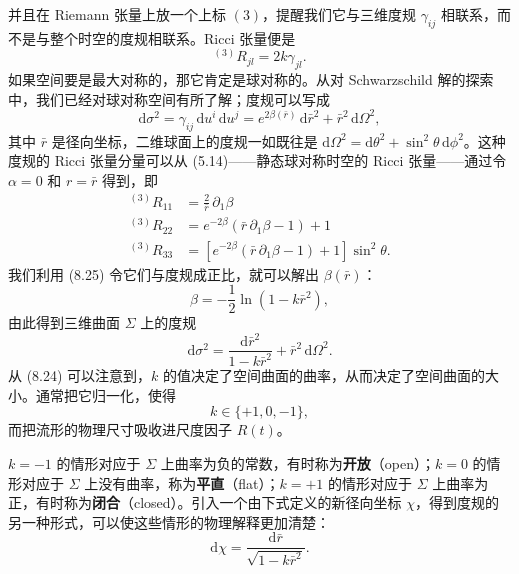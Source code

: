 并且在 Riemann 张量上放一个上标 $(3)$，提醒我们它与三维度规 $\gamma_{ij}$ 相联系，而不是与整个时空的度规相联系。Ricci 张量便是
\begin{equation*}
{}^{(3)}R_{jl} = 2k\gamma_{jl}.
\tag{8.25}
\end{equation*}
如果空间要是最大对称的，那它肯定是球对称的。从对 Schwarzschild 解的探索中，我们已经对球对称空间有所了解；度规可以写成
\begin{equation*}
\mathrm{d}\sigma^2 = \gamma_{ij}\,\mathrm{d}u^i\,\mathrm{d}u^j = e^{2\beta(\bar{r})}\,\mathrm{d}\bar{r}^2 + \bar{r}^2\,\mathrm{d}\Omega^2,
\tag{8.26}
\end{equation*}
其中 $\bar{r}$ 是径向坐标，二维球面上的度规一如既往是 $\mathrm{d}\Omega^2 = \mathrm{d}\theta^2 + \sin^2\theta\,\mathrm{d}\phi^2$。这种度规的 Ricci 张量分量可以从 (5.14)——静态球对称时空的 Ricci 张量——通过令 $\alpha=0$ 和 $r=\bar{r}$ 得到，即
\begin{equation*}
\begin{aligned}
{}^{(3)}R_{11} &= \frac{2}{\bar{r}}\,\partial_1\beta\\
{}^{(3)}R_{22} &= e^{-2\beta}\left(\bar{r}\,\partial_1\beta - 1\right) + 1\\
{}^{(3)}R_{33} &= \left[e^{-2\beta}\left(\bar{r}\,\partial_1\beta - 1\right) + 1\right]\sin^2\theta.
\end{aligned}
\tag{8.27}
\end{equation*}
我们利用 (8.25) 令它们与度规成正比，就可以解出 $\beta(\bar{r})$：
\begin{equation*}
\beta = -\frac{1}{2}\ln\left(1-k\bar{r}^2\right),
\tag{8.28}
\end{equation*}
由此得到三维曲面 $\Sigma$ 上的度规
\begin{equation*}
\mathrm{d}\sigma^2 = \frac{\mathrm{d}\bar{r}^2}{1-k\bar{r}^2} + \bar{r}^2\,\mathrm{d}\Omega^2.
\tag{8.29}
\end{equation*}
从 (8.24) 可以注意到，$k$ 的值决定了空间曲面的曲率，从而决定了空间曲面的大小。通常把它归一化，使得
\begin{equation*}
k \in \{+1, 0, -1\},
\tag{8.30}
\end{equation*}
而把流形的物理尺寸吸收进尺度因子 $R(t)$。

$k=-1$ 的情形对应于 $\Sigma$ 上曲率为负的常数，有时称为\textbf{开放}（open）；$k=0$ 的情形对应于 $\Sigma$ 上没有曲率，称为\textbf{平直}（flat）；$k=+1$ 的情形对应于 $\Sigma$ 上曲率为正，有时称为\textbf{闭合}（closed）。引入一个由下式定义的新径向坐标 $\chi$，得到度规的另一种形式，可以使这些情形的物理解释更加清楚：
\begin{equation*}
\mathrm{d}\chi = \frac{\mathrm{d}\bar{r}}{\sqrt{1-k\bar{r}^2}}.
\tag{8.31}
\end{equation*}

